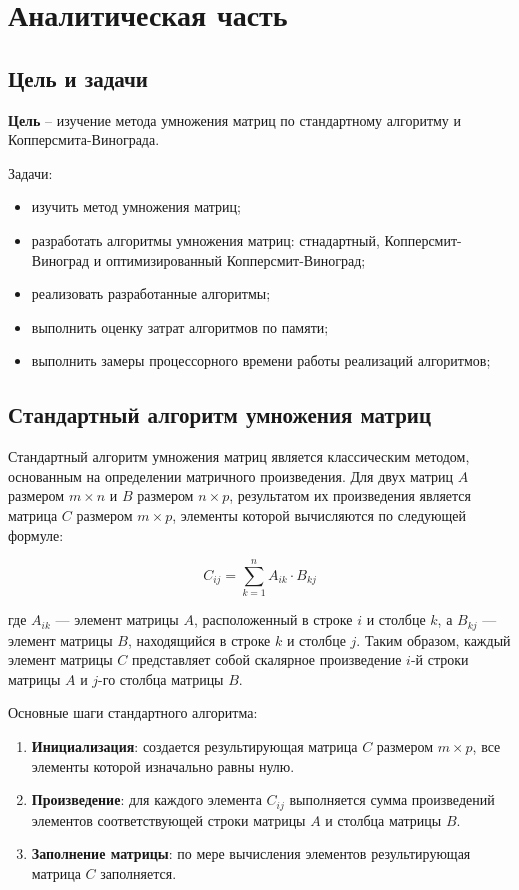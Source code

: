 \chapter{Аналитическая часть}
\section{Цель и задачи}

\textbf{Цель} -- изучение метода умножения матриц по стандартному алгоритму и
Копперсмита-Винограда.

Задачи:

\begin{itemize}
	\item изучить метод умножения матриц;
	\item разработать алгоритмы умножения матриц: стнадартный, Копперсмит-Виноград и оптимизированный Копперсмит-Виноград;
	\item реализовать разработанные алгоритмы;
	\item выполнить оценку затрат алгоритмов по памяти;
	\item выполнить замеры процессорного времени работы реализаций алгоритмов;
\end{itemize} 

\section{Стандартный алгоритм умножения матриц}

Стандартный алгоритм умножения матриц является классическим методом,
основанным на определении матричного произведения.
Для двух матриц \( A \) размером \( m \times n \) и \( B \) размером \( n \times p \),
результатом их произведения является матрица \( C \) размером \( m \times p \),
элементы которой вычисляются по следующей формуле:

\[
C_{ij} = \sum_{k=1}^{n} A_{ik} \cdot B_{kj}
\]

где \( A_{ik} \) — элемент матрицы \( A \), расположенный в строке \( i \) и столбце \( k \), а \( B_{kj} \) — элемент матрицы \( B \), находящийся в строке \( k \) и столбце \( j \). Таким образом, каждый элемент матрицы \( C \) представляет собой скалярное произведение \( i \)-й строки матрицы \( A \) и \( j \)-го столбца матрицы \( B \).

Основные шаги стандартного алгоритма:

\begin{enumerate}
    \item \textbf{Инициализация}: создается результирующая матрица \( C \) размером \( m \times p \), все элементы которой изначально равны нулю.
    \item \textbf{Произведение}: для каждого элемента \( C_{ij} \) выполняется сумма произведений элементов соответствующей строки матрицы \( A \) и столбца матрицы \( B \).
    \item \textbf{Заполнение матрицы}: по мере вычисления элементов результирующая матрица \( C \) заполняется.
\end{enumerate}

